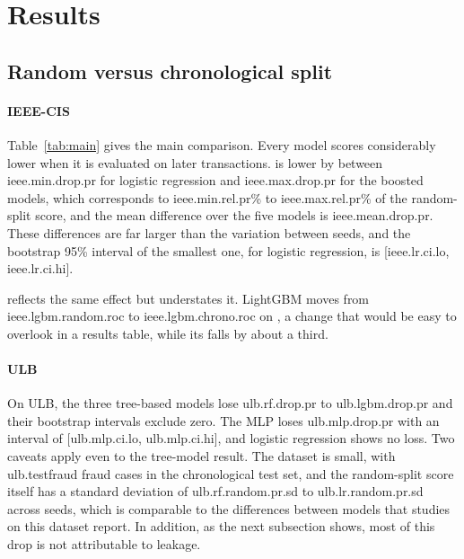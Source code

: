 \section{Results}
\label{sec:results}

\subsection{Random versus chronological split}



\paragraph{IEEE-CIS}
Table~\ref{tab:main} gives the main comparison. Every model scores considerably lower when it is evaluated on later transactions. \prauc{} is lower by between \num{ieee.min.drop.pr} for logistic regression and \num{ieee.max.drop.pr} for the boosted models, which corresponds to \num{ieee.min.rel.pr}\% to \num{ieee.max.rel.pr}\% of the random-split score, and the mean difference over the five models is \num{ieee.mean.drop.pr}. These differences are far larger than the variation between seeds, and the bootstrap 95\% interval of the smallest one, for logistic regression, is [\num{ieee.lr.ci.lo}, \num{ieee.lr.ci.hi}].

\rocauc{} reflects the same effect but understates it. LightGBM moves from \num{ieee.lgbm.random.roc} to \num{ieee.lgbm.chrono.roc} on \rocauc{}, a change that would be easy to overlook in a results table, while its \prauc{} falls by about a third.

\paragraph{ULB}
On ULB, the three tree-based models lose \num{ulb.rf.drop.pr} to \num{ulb.lgbm.drop.pr} \prauc{} and their bootstrap intervals exclude zero. The MLP loses \num{ulb.mlp.drop.pr} with an interval of [\num{ulb.mlp.ci.lo}, \num{ulb.mlp.ci.hi}], and logistic regression shows no loss. Two caveats apply even to the tree-model result. The dataset is small, with \num{ulb.testfraud} fraud cases in the chronological test set, and the random-split score itself has a standard deviation of \num{ulb.rf.random.pr.sd} to \num{ulb.lr.random.pr.sd} across seeds, which is comparable to the differences between models that studies on this dataset report. In addition, as the next subsection shows, most of this drop is not attributable to leakage.

